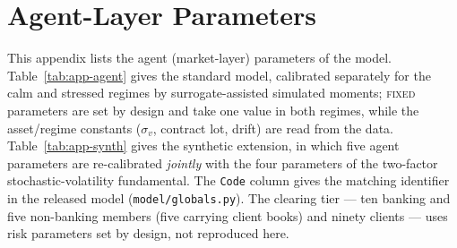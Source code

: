 
\section{Agent-Layer Parameters}\label{app:params}
This appendix lists the agent (market-layer) parameters of the model. Table~\ref{tab:app-agent} gives the
standard model, calibrated separately for the calm and stressed regimes by surrogate-assisted simulated
moments; \textsc{fixed} parameters are set by design and take one value in both regimes, while the
asset/regime constants ($\sigma_v$, contract lot, drift) are read from the data. Table~\ref{tab:app-synth}
gives the synthetic extension, in which five agent parameters are re-calibrated \emph{jointly} with the four
parameters of the two-factor stochastic-volatility fundamental. The \texttt{Code} column gives the matching
identifier in the released model (\texttt{model/globals.py}). The clearing tier --- ten banking and five
non-banking members (five carrying client books) and ninety clients --- uses risk parameters set by design,
not reproduced here.

